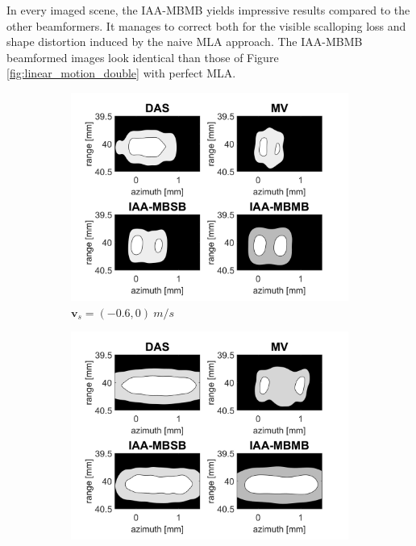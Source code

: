 In every imaged scene, the IAA-MBMB yields impressive results compared to the other beamformers.
It manages to correct both for the visible scalloping loss and shape distortion induced by the naive MLA approach.
The IAA-MBMB beamformed images look identical than those of Figure \ref{fig:linear_motion_double} with perfect MLA.


\begin{figure}[ht]
    \centering
    \begin{subfigure}[t]{0.48\linewidth}
        \includegraphics[width=\linewidth]{./images/results/4/motion_0_-06.png}
        \caption{$\boldsymbol{v}_s = (-0.6, 0)~m/s$}
        \label{fig:mla_a}
    \end{subfigure}
    \quad
    \begin{subfigure}[t]{0.48\linewidth}
        \includegraphics[width=\linewidth]{./images/results/4/motion_0_06.png}

\end{subfigure}
\end{figure}
